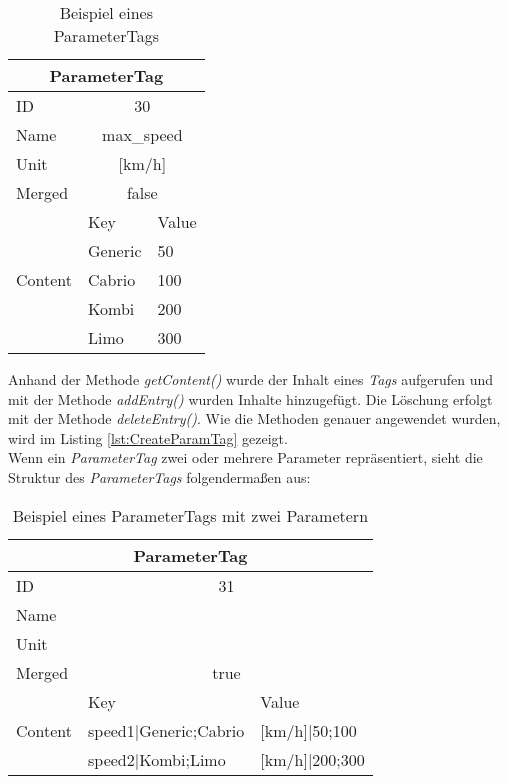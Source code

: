 \begin{table}[h]
\begin{center}
	\begin{tabular}{|l||ll|}
	 \hline
	 \multicolumn{3}{|c|}{ParameterTag}\\
	 \hline\hline
	 ID			& \multicolumn{2}{|c|}{30}\\
	 \hline
	 Name		& \multicolumn{2}{|c|}{max\_speed}\\
	 \hline
	 Unit		& \multicolumn{2}{|c|}{[km/h]}\\
	 \hline
	 Merged		& \multicolumn{2}{|c|}{false}\\
	 \hline
	 \multirow{5}{*}{Content}	&Key			&Value\\ \cline{2-3}
	 							&Generic		&50\\
	 							&Cabrio		&100\\
	 							&Kombi		&200\\
	 							&Limo		&300\\
	 \hline
	\end{tabular}
	
	\caption{Beispiel eines ParameterTags}
	\label{table:ParameterTagStruktur}
\end{center}
\end{table}


Anhand der Methode \textit{getContent()} wurde der Inhalt eines \textit{Tags} aufgerufen und mit der Methode \textit{addEntry()} wurden Inhalte hinzugefügt. Die Löschung erfolgt mit der Methode \textit{deleteEntry()}. Wie die Methoden genauer angewendet wurden, wird im Listing \ref{lst:CreateParamTag} gezeigt.\\


Wenn ein \textit{ParameterTag} zwei oder mehrere Parameter repräsentiert, sieht die Struktur des \textit{ParameterTags} folgendermaßen aus:

\begin{table}[h]
\begin{center}
	\begin{tabular}{|l||ll|}
	 \hline
	 \multicolumn{3}{|c|}{ParameterTag}\\
	 \hline\hline
	 ID			& \multicolumn{2}{|c|}{31}\\
	 \hline
	 Name		& \multicolumn{2}{|c|}{}\\
	 \hline
	 Unit		& \multicolumn{2}{|c|}{}\\
	 \hline
	 Merged		& \multicolumn{2}{|c|}{true}\\
	 \hline
	 \multirow{3}{*}{Content}	&Key			&Value\\ \cline{2-3}
	 							&speed1|Generic;Cabrio &[km/h]|50;100\\
	 							&speed2|Kombi;Limo     &[km/h]|200;300\\
	 \hline
	\end{tabular}
	
	\caption{Beispiel eines ParameterTags mit zwei Parametern}
	\label{table:PTagMergeStruktur}
\end{center}
\end{table}

